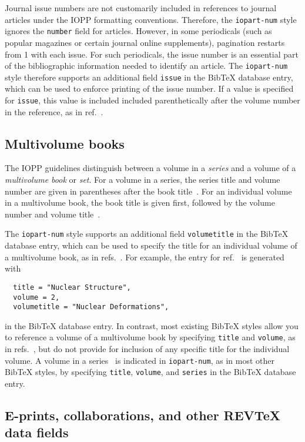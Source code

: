\documentclass[12pt]{iopart}
\newcommand{\BibTeX}{Bib\TeX}
\newcommand{\REVTeX}{REV\TeX}
\begin{document}
Journal issue numbers are not customarily included in references to
journal articles under the IOPP formatting conventions.
Therefore, the
\texttt{iopart-num} style ignores the
\verb+number+ field for articles.  
However, in some periodicals (such as popular magazines or certain
journal online supplements), pagination restarts from 1 with each
issue.  For such periodicals, the issue number is an essential part of
the bibliographic information needed to identify an article.  The
\texttt{iopart-num} style therefore supports an additional field
\verb+issue+ in the \BibTeX{} database entry, which can be used to 
enforce printing of the issue number.  If a value is specified for
\verb+issue+, this value is included included parenthetically after the volume
number in the reference, as in
ref.~\cite{zamfir2005:132te-beta-enam04}.

\subsection{Multivolume books}

The IOPP guidelines distinguish between a volume
in a {\it series}
and a volume of a {\it  multivolume book} or {\it set}.  For a volume in
a series, the series title and volume number are given in parentheses
after the book title~\cite{ex8}.
For an individual volume in a multivolume book, the book title is
given first, followed by the volume number and volume title~\cite{ex9}.

The
\texttt{iopart-num} style supports an additional field
\verb+volumetitle+ in the \BibTeX{} database entry, which can be used to 
specify the title for an individual volume of a multivolume
book, as in refs.~\cite{ex9,bohr1998:v2}.  For example, the entry for
ref.~\cite{bohr1998:v2} is generated with
\begin{verbatim}
  title = "Nuclear Structure",
  volume = 2,
  volumetitle = "Nuclear Deformations",
\end{verbatim}
in the \BibTeX{} database entry.  In contrast, most existing \BibTeX{} styles 
allow you to reference a volume of a multivolume
book by specifying \verb+title+ and
\verb+volume+, as in
refs.~\cite{ex7,siegbahn1965:v1}, but do not provide for inclusion of
any specific title for the individual volume.  A volume in a
series~\cite{ex8,iachello2006:liealg} is indicated in
\texttt{iopart-num}, as in most other \BibTeX{}
styles, 
by specifying
\verb+title+, \verb+volume+, and
\verb+series+ in the \BibTeX{} database entry.  

\subsection{E-prints, collaborations, and other \REVTeX{} data fields}
\end{document}
